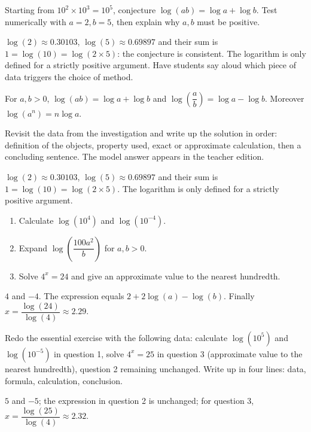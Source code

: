 \begin{activity}
Starting from $10^2\times10^3=10^5$, conjecture $\log(ab)=\log a+\log b$. Test numerically with $a=2,b=5$, then explain why $a,b$ must be positive.

\end{activity}
\begin{solution}$\log(2)\approx\num{0,30103}$, $\log(5)\approx\num{0,69897}$ and their sum is $1=\log(10)=\log(2\times5)$: the conjecture is consistent. The logarithm is only defined for a strictly positive argument. Have students say aloud which piece of data triggers the choice of method.\end{solution}

\begin{summary}For $a,b>0$, $\log(ab)=\log a+\log b$ and $\log\!\left(\dfrac ab\right)=\log a-\log b$. Moreover $\log(a^n)=n\log a$.\end{summary}

\begin{example}
Revisit the data from the investigation and write up the solution in order: definition of the objects, property used, exact or approximate calculation, then a concluding sentence. The model answer appears in the teacher edition.
\end{example}
\begin{solution}$\log(2)\approx\num{0,30103}$, $\log(5)\approx\num{0,69897}$ and their sum is $1=\log(10)=\log(2\times5)$. The logarithm is only defined for a strictly positive argument.\end{solution}

\begin{exercise}[essential]
\begin{enumerate}\item Calculate $\log(10^4)$ and $\log(10^{-4})$.\item Expand $\log\!\left(\dfrac{100a^2}{b}\right)$ for $a,b>0$.\item Solve $4^x=24$ and give an approximate value to the nearest hundredth.\end{enumerate}
\end{exercise}
\begin{solution}$4$ and $-4$. The expression equals $2+2\log(a)-\log(b)$. Finally $x=\dfrac{\log(24)}{\log(4)}\approx\num{2,29}$.\end{solution}


\begin{homework}Redo the essential exercise with the following data: calculate $\log(10^{5})$ and $\log(10^{-5})$ in question 1, solve $4^x=25$ in question 3 (approximate value to the nearest hundredth), question 2 remaining unchanged. Write up in four lines: data, formula, calculation, conclusion.\end{homework}
\begin{solution}$5$ and $-5$; the expression in question 2 is unchanged; for question 3, $x=\dfrac{\log(25)}{\log(4)}\approx\num{2,32}$.\end{solution}

